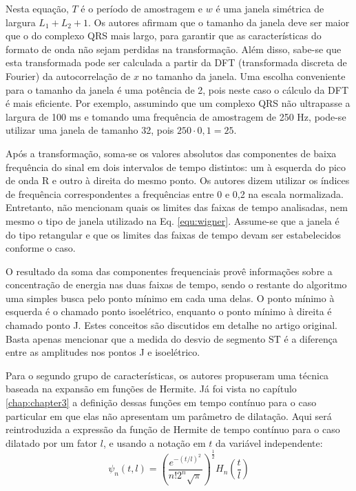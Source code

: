Nesta equação, $T$ é o período de amostragem e $w$ é uma janela simétrica de largura $L_1+L_2+1$. Os autores afirmam que o tamanho da janela deve ser maior que o do complexo QRS mais largo, para garantir que as características do formato de onda não sejam perdidas na transformação. Além disso, sabe-se que esta transformada pode ser calculada a partir da DFT (transformada discreta de Fourier) da autocorrelação de $x$ no tamanho da janela. Uma escolha conveniente para o tamanho da janela é uma potência de 2, pois neste caso o cálculo da DFT é mais eficiente. Por exemplo, assumindo que um complexo QRS não ultrapasse a largura de 100 ms e tomando uma frequência de amostragem de 250 Hz, pode-se utilizar uma janela de tamanho 32, pois $250\cdot 0,1 = 25$.

Após a transformação, soma-se os valores absolutos das componentes de baixa frequência do sinal em dois intervalos de tempo distintos: um à esquerda do pico de onda R e outro à direita do mesmo ponto. Os autores dizem utilizar os índices de frequência correspondentes a frequências entre 0 e 0,2 na escala normalizada. Entretanto, não mencionam quais os limites das faixas de tempo analisadas, nem mesmo o tipo de janela utilizado na Eq. \ref{equ:wigner}. Assume-se que a janela é do tipo retangular e que os limites das faixas de tempo devam ser estabelecidos conforme o caso.

O resultado da soma das componentes frequenciais provê informações sobre a concentração de energia nas duas faixas de tempo, sendo o restante do algoritmo uma simples busca pelo ponto mínimo em cada uma delas. O ponto mínimo à esquerda é o chamado ponto isoelétrico, enquanto o ponto mínimo à direita é chamado ponto J. Estes conceitos são discutidos em detalhe no artigo original. Basta apenas mencionar que a medida do desvio de segmento ST é a diferença entre as amplitudes nos pontos J e isoelétrico.

Para o segundo grupo de características, os autores propuseram uma técnica baseada na expansão em funções de Hermite. Já foi vista no capítulo \ref{chap:chapter3} a definição dessas funções em tempo contínuo para o caso particular em que elas não apresentam um parâmetro de dilatação. Aqui será reintroduzida a expressão da função de Hermite de tempo contínuo para o caso dilatado por um fator $l$, e usando a notação em $t$ da variável independente:
\begin{equation}
    \psi_n(t,l) = \left(\frac{e^{-(t/l)^2}}{n!2^n\sqrt{\pi}}\right)^\frac{1}{2} H_n\left(\frac{t}{l}\right)
\end{equation}


